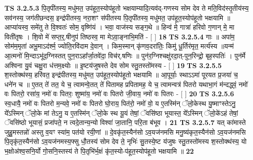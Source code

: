 \documentclass[17pt]{extarticle}
\begin{document}
                  \newline
                                \textbf{ TS 3.2.5.3} \newline
                  पि॒तृपी॑तस्य॒ मधु॑मत॒ उप॑हूत॒स्योप॑हूतो भक्षयाम्यादि॒त्यव॑द्-गणस्य सोम देव ते मति॒विद॑स्तृ॒तीय॑स्य॒ सव॑नस्य॒ जग॑तीछन्दस॒ इन्द्र॑पीतस्य॒ नरा॒शꣳ स॑पीतस्य पि॒तृपी॑तस्य॒ मधु॑मत॒ उप॑हूत॒स्योप॑हूतो भक्षयामि ॥ आप्या॑यस्व॒ समे॑तु ते वि॒श्वतः॑ सोम॒ वृष्णि॑यं । भवा॒ वाज॑स्य सङ्ग॒थे ॥ हिन्व॑ मे॒ गात्रा॑ हरिवो ग॒णान् मे॒ मा विती॑तृषः । शि॒वो मे॑ सप्त॒र्॒.षीनुप॑ तिष्ठस्व॒ मा मेऽवा॒ङ्नाभि॒मति॑ - [  ] \textbf{  18} \newline
                  \newline
                                \textbf{ TS 3.2.5.4} \newline
                  गाः ॥ अपा॑म॒ सोम॑म॒मृता॑ अभू॒माऽद॑र्श्म॒ ज्योति॒रवि॑दाम दे॒वान् । किम॒स्मान् कृ॑णव॒दरा॑तिः॒ किमु॑ धू॒र्तिर॑मृत॒ मर्त्य॑स्य ॥यन्म॑ आ॒त्मनो॑ मि॒न्दाऽभू॑द॒ग्निस्तत् पुन॒राऽहा᳚र्जा॒तवे॑दा॒ विच॑र्.षणिः ॥ पुन॑र॒ग्निश्चक्षु॑रदा॒त्-पुन॒रिन्द्रो॒ बृह॒स्पतिः॑ । पुन॑र्मे अश्विना यु॒वं चक्षु॒रा ध॑त्तम॒क्ष्योः ॥ इ॒ष्टय॑जुषस्ते देव सोम स्तु॒तस्तो॑मस्य - [  ] \textbf{  19} \newline
                  \newline
                                \textbf{ TS 3.2.5.5} \newline
                  श॒स्तोक्थ॑स्य॒ हरि॑वत॒ इन्द्र॑पीतस्य॒ मधु॑मत॒ उप॑हूत॒स्योप॑हूतो भक्षयामि ॥ आ॒पूर्याः॒ स्थाऽऽमा॑ पूरयत प्र॒जया॑ च॒ धने॑न च ॥ ए॒तत् ते॑ तत॒ ये च॒ त्वामन्वे॒तत् ते॑ पितामह प्रपितामह॒ ये च॒ त्वामन्वत्र॑ पितरो यथाभा॒गं म॑न्दद्ध्वं॒ नमो॑ वः पितरो॒ रसा॑य॒ नमो॑ वः पितरः॒ शुष्मा॑य॒ नमो॑ वः पितरो जी॒वाय॒ नमो॑ वः पितरः - [  ] \textbf{  20} \newline
                  \newline
                                \textbf{ TS 3.2.5.6} \newline
                  स्व॒धायै॒ नमो॑ वः पितरो म॒न्यवे॒ नमो॑ वः पितरो घो॒राय॒ पित॑रो॒ नमो॑ वो॒ य ए॒तस्मि॑न् ॅलो॒केस्थ यु॒ष्माꣳस्तेऽनु॒ ये᳚ऽस्मिन् ॅलो॒के मां तेऽनु॒ य ए॒तस्मि॑न् ॅलो॒के स्थ यू॒यं तेषां॒ ॅवसि॑ष्ठा भूयास्त॒ ये᳚ऽस्मिन् ॅलो॒के॑ऽहं तेषां॒ ॅवसि॑ष्ठो भूयासं॒ प्रजा॑पते॒ न त्वदे॒तान्य॒न्यो विश्वा॑ जा॒तानि॒ परि॒ता ब॑भूव । \textbf{  21} \newline
                  \newline
                                \textbf{ TS 3.2.5.7} \newline
                  यत् का॑मास्ते जुहु॒मस्तन्नो॑ अस्तु व॒यꣳ स्या॑म॒ पत॑यो रयी॒णां ॥ दे॒वकृ॑त॒स्यैन॑सो ऽव॒यज॑नमसि मनु॒ष्य॑कृत॒स्यैन॑सो ऽव॒यज॑नमसि पि॒तृकृ॑त॒स्यैन॑सो ऽव॒यज॑नमस्य॒फ्सु धौ॒तस्य॑ सोम देव ते॒ नृभिः॑ सु॒तस्ये॒ष्ट य॑जुषः स्तु॒तस्तो॑मस्य श॒स्तोक्थ॑स्य॒ यो भ॒क्षोअ॑श्व॒सनि॒र्यो गो॒सनि॒स्तस्य॑ ते पि॒तृभि॑र्भ॒क्षं कृ॑त॒स्यो-प॑हूत॒स्योप॑हूतो भक्षयामि ॥ \textbf{  22} \newline
\end{document}
